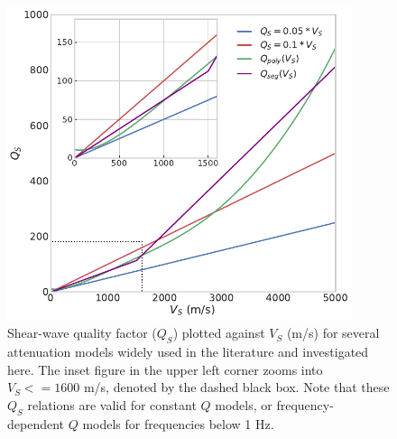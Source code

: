 




\begin{figure}[!ht]
  \centering
  \includegraphics[width=0.9\textwidth,height=0.85\textheight,keepaspectratio]{figures/figure_highf_S1.pdf}
  \caption{
  Shear-wave quality factor ($Q_S$) plotted against $V_S$ (m/s) for several attenuation models widely used in the literature  and investigated here. The inset figure in the upper left corner zooms into $V_S <= 1600$ m/s, denoted by the dashed black box. Note that these $Q_S$ relations are valid for constant $Q$ models, or frequency-dependent $Q$ models for frequencies below 1 Hz.}
  \label{fig:highf-S1}
\end{figure}
\clearpage

